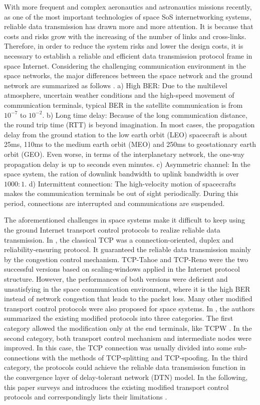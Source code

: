 \documentclass[draftclsnofoot,onecolumn,11pt]{IEEEtran}
\begin{document}
With more frequent and complex aeronautics and astronautics missions recently, as one of the most important technologies of space SoS internetworking systems, reliable data transmission has drawn more and more attention. It is because that costs and risks grow with the increasing of the number of links and cross-links. Therefore, in order to reduce the system risks and lower the design costs, it is necessary to establish a reliable and efficient data transmission protocol frame in space Internet. Considering the challenging communication environment in the space networks, the major differences between the space network and the ground network are summarized as follows \cite{urke2011transport}.
a) High BER: Due to the multilevel atmosphere, uncertain weather conditions and the high-speed movement of communication terminals, typical BER in the satellite communication is from $10^{-7}$ to $10^{-2}$.
b) Long time delay: Because of the long communication distance, the round trip time (RTT) is beyond imagination. In most cases, the propagation delay from the ground station to the low earth orbit (LEO) spacecraft is about 25ms, 110ms to the medium earth orbit (MEO) and 250ms to geostationary earth orbit (GEO). Even worse, in terms of the interplanetary network, the one-way propagation delay is up to seconds even minutes.
c) Asymmetric channel: In the space system, the ration of downlink bandwidth to uplink bandwidth is over $1000:1$.
d) Intermittent connection: The high-velocity motion of spacecrafts makes the communication terminals be out of sight periodically. During this period, connections are interrupted and communications are suspended.

The aforementioned challenges in space systems make it difficult to keep using the ground Internet transport control protocols to realize reliable data transmission. In \cite{fall2011tcp}, the classical TCP was a connection-oriented, duplex and reliability-ensuring protocol. It guaranteed the reliable data transmission mainly by the congestion control mechanism. TCP-Tahoe \cite{wang1992eliminating} and TCP-Reno \cite{padhye2000modeling} were the two successful versions based on scaling-windows applied in the Internet protocol structure. However, the performances of both versions were deficient and unsatisfying in the space communication environment, where it is the high BER instead of network congestion that leads to the packet loss.
Many other modified transport control protocols were also proposed for space systems. In \cite{wang2009protocols}, the authors summarized the existing modified protocols into three categories. The first category allowed the modification only at the end terminals, like TCPW \cite{casetti2002tcp}. In the second category, both transport control mechanism and intermediate nodes were improved. In this case, the TCP connection was usually divided into some sub-connections with the methods of TCP-splitting and TCP-spoofing. In the third category, the protocols could achieve the reliable data transmission function in the convergence layer
of delay-tolerant network (DTN) \cite{sun2013performance} model. In the following, this paper surveys and introduces the existing modified transport control protocols and correspondingly lists their limitations \cite{wang2009protocol}.
\end{document}
